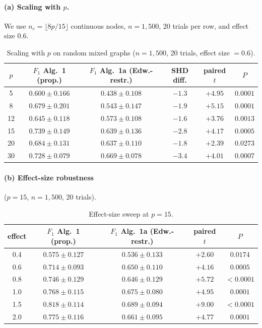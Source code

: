 \paragraph{\texorpdfstring{(a) Scaling with $p$.}{(a) Scaling with p.}} We use
$n_c = \lfloor 8p/15 \rfloor$ continuous nodes, $n = 1{,}500$, 20
trials per row, and effect size 0.6.

\begin{table}[ht]
\centering
\caption{Scaling with $p$ on random mixed graphs ($n = 1{,}500$, 20
trials, effect size $= 0.6$).}
\label{tab:scaling}
\small
\begin{tabular}{cccccc}
\toprule
$p$ & $F_1$ Alg.~1 (prop.) & $F_1$ Alg.~1a (Edw.-restr.) & SHD diff. & paired $t$ & $P$ \\
\midrule
5   & $0.600 \pm 0.166$ & $0.438 \pm 0.108$ & $-1.3$ & $+4.95$ & $0.0001$ \\
8   & $0.679 \pm 0.201$ & $0.543 \pm 0.147$ & $-1.9$ & $+5.15$ & $0.0001$ \\
12  & $0.645 \pm 0.118$ & $0.573 \pm 0.108$ & $-1.6$ & $+3.76$ & $0.0013$ \\
15  & $0.739 \pm 0.149$ & $0.639 \pm 0.136$ & $-2.8$ & $+4.17$ & $0.0005$ \\
20  & $0.684 \pm 0.131$ & $0.637 \pm 0.110$ & $-1.8$ & $+2.39$ & $0.0273$ \\
30  & $0.728 \pm 0.079$ & $0.669 \pm 0.078$ & $-3.4$ & $+4.01$ & $0.0007$ \\
\bottomrule
\end{tabular}
\end{table}

\paragraph{(b) Effect-size robustness} ($p = 15$, $n = 1{,}500$, 20
trials).

\begin{table}[ht]
\centering
\caption{Effect-size sweep at $p = 15$.}
\label{tab:effect}
\begin{tabular}{ccccc}
\toprule
effect & $F_1$ Alg.~1 (prop.) & $F_1$ Alg.~1a (Edw.-restr.) & paired $t$ & $P$ \\
\midrule
0.4 & $0.575 \pm 0.127$ & $0.536 \pm 0.133$ & $+2.60$ & $0.0174$ \\
0.6 & $0.714 \pm 0.093$ & $0.650 \pm 0.110$ & $+4.16$ & $0.0005$ \\
0.8 & $0.746 \pm 0.129$ & $0.646 \pm 0.129$ & $+5.72$ & $<0.0001$ \\
1.0 & $0.768 \pm 0.115$ & $0.675 \pm 0.080$ & $+4.95$ & $0.0001$ \\
1.5 & $0.818 \pm 0.114$ & $0.689 \pm 0.094$ & $+9.00$ & $<0.0001$ \\
2.0 & $0.775 \pm 0.116$ & $0.661 \pm 0.095$ & $+4.77$ & $0.0001$ \\
\bottomrule
\end{tabular}
\end{table}

